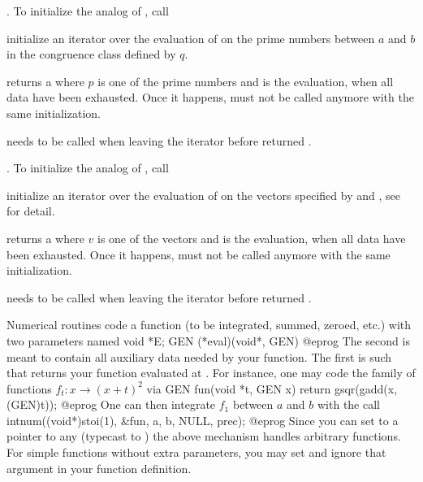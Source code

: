 \item {}. To initialize the analog of
, call

initialize an iterator over the evaluation of  on the prime numbers
between $a$ and $b$ in the congruence class defined by $q$.

 returns a 
\kbd{[p,code(p)]} where $p$ is one of the prime numbers and  is
the evaluation,  when all data have been exhausted. Once it happens,
must not be called anymore with the same initialization.

 needs to be called when leaving
the iterator before  returned .

\item {}. To initialize the analog of
, call

initialize an iterator over the evaluation of  on the vectors
specified by  and , see  for detail.

 returns a  \kbd{[v,code(v)]}
where $v$ is one of the vectors and  is the evaluation, 
when all data have been exhausted.  Once it happens, 
must not be called anymore with the same initialization.

 needs to be called when leaving the
iterator before  returned .


Numerical routines code a function (to be integrated, summed, zeroed, etc.)
with two parameters named
\bprog
  void *E;
  GEN (*eval)(void*, GEN)
@eprog\noindent
The second is meant to contain all auxiliary data needed by your function.
The first is such that  returns your function evaluated at
. For instance, one may code the family of functions
$f_t: x \to (x+t)^2$ via
\bprog
GEN fun(void *t, GEN x) { return gsqr(gadd(x, (GEN)t)); }
@eprog\noindent
One can then integrate $f_1$ between $a$ and $b$ with the call
\bprog
intnum((void*)stoi(1), &fun, a, b, NULL, prec);
@eprog\noindent
Since you can set  to a pointer to any  (typecast to
) the above mechanism handles arbitrary functions. For simple
functions without extra parameters, you may set  and ignore
that argument in your function definition.

